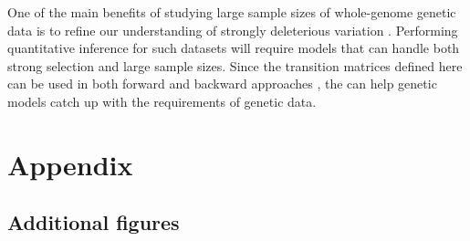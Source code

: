 \documentclass[review]{elsarticle}
\begin{document}
 

One of the main benefits of studying large sample sizes of whole-genome
genetic data is to refine our understanding of strongly deleterious variation \cite{karczewski2020mutational}. Performing 
quantitative inference for such datasets will require models that can handle both strong selection and large sample sizes.  
Since the transition matrices defined here can be used in both forward \citep{JouganousEtAl2017} 
and backward approaches \cite{KammEtAl2017}, the can help genetic models catch up with the requirements of genetic data.




\section{Appendix}

\subsection{Additional figures}
\label{subsec_apx_figures}

\end{document}
